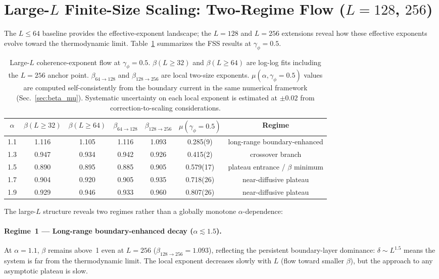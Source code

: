 \documentclass[aps,prb,twocolumn,superscriptaddress,floatfix]{revtex4-2}
\begin{document}
\section{Large-$L$ Finite-Size Scaling: Two-Regime Flow ($L = 128$, $256$)}
\label{sec:FSS}

The $L \le 64$ baseline provides the effective-exponent landscape; the $L = 128$ and $L = 256$ extensions reveal how these effective exponents evolve toward the thermodynamic limit. Table~\ref{tab:fss} summarizes the FSS results at $\gamma_\phi = 0.5$.

\begin{table}[tbp]
\caption{Large-$L$ coherence-exponent flow at $\gamma_\phi = 0.5$. $\beta(L \ge 32)$ and $\beta(L \ge 64)$ are log-log fits including the $L = 256$ anchor point. $\beta_{64 \to 128}$ and $\beta_{128 \to 256}$ are local two-size exponents. $\mu(\alpha, \gamma_\phi=0.5)$ values are computed self-consistently from the boundary current in the same numerical framework (Sec.~\ref{sec:beta_mu}). Systematic uncertainty on each local exponent is estimated at $\pm 0.02$ from correction-to-scaling considerations.}
\label{tab:fss}
\begin{ruledtabular}
\begin{tabular}{ccccccc}
$\alpha$ & $\beta(L \ge 32)$ & $\beta(L \ge 64)$ & $\beta_{64 \to 128}$ & $\beta_{128 \to 256}$ & $\mu(\gamma_\phi=0.5)$ & Regime \\
\hline
1.1 & 1.116 & 1.105 & 1.116 & 1.093 & 0.285(9) & long-range boundary-enhanced \\
1.3 & 0.947 & 0.934 & 0.942 & 0.926 & 0.415(2) & crossover branch \\
1.5 & 0.890 & 0.895 & 0.885 & 0.905 & 0.579(17) & plateau entrance / $\beta$ minimum \\
1.7 & 0.904 & 0.920 & 0.905 & 0.935 & 0.718(26) & near-diffusive plateau \\
1.9 & 0.929 & 0.946 & 0.933 & 0.960 & 0.807(26) & near-diffusive plateau
\end{tabular}
\end{ruledtabular}
\end{table}

The large-$L$ structure reveals two regimes rather than a globally monotone $\alpha$-dependence:

\paragraph{Regime~1 --- Long-range boundary-enhanced decay ($\alpha \lesssim 1.5$).}
At $\alpha = 1.1$, $\beta$ remains above~1 even at $L = 256$ ($\beta_{128 \to 256} = 1.093$), reflecting the persistent boundary-layer dominance: $\delta \sim L^{1.5}$ means the system is far from the thermodynamic limit. The local exponent decreases slowly with $L$ (flow toward smaller $\beta$), but the approach to any asymptotic plateau is slow.
\end{document}
